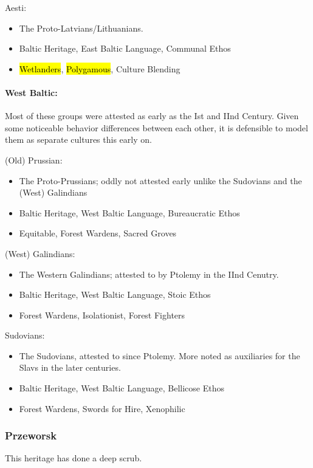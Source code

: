 \documentclass{article}
\begin{document}
	Aesti:
	\begin{itemize}
		\item The Proto-Latvians/Lithuanians.
		\item Baltic Heritage, East Baltic Language, Communal Ethos
		\item \hl{Wetlanders}, \hl{Polygamous}, Culture Blending
	\end{itemize}
	
	\paragraph{West Baltic:}
	Most of these groups were attested as early as the Ist and IInd Century.
	Given some noticeable behavior differences between each other, it is defensible to model them as separate cultures this early on.
	
	(Old) Prussian:
	\begin{itemize}
		\item The Proto-Prussians; oddly not attested early unlike the Sudovians and the (West) Galindians
		\item Baltic Heritage, West Baltic Language, Bureaucratic Ethos
		\item Equitable, Forest Wardens, Sacred Groves
	\end{itemize}
	
	(West) Galindians:
	\begin{itemize}
		\item The Western Galindians; attested to by Ptolemy in the IInd Cenutry.
		\item Baltic Heritage, West Baltic Language, Stoic Ethos
		\item Forest Wardens, Isolationist, Forest Fighters
	\end{itemize}
	
	Sudovians:
	\begin{itemize}
		\item The Sudovians, attested to since Ptolemy. More noted as auxiliaries for the Slavs in the later centuries.
		\item Baltic Heritage, West Baltic Language, Bellicose Ethos
		\item Forest Wardens, Swords for Hire, Xenophilic
	\end{itemize}
	
	\subsubsection{Przeworsk}
	This heritage has done a deep scrub.
	
\end{document}
